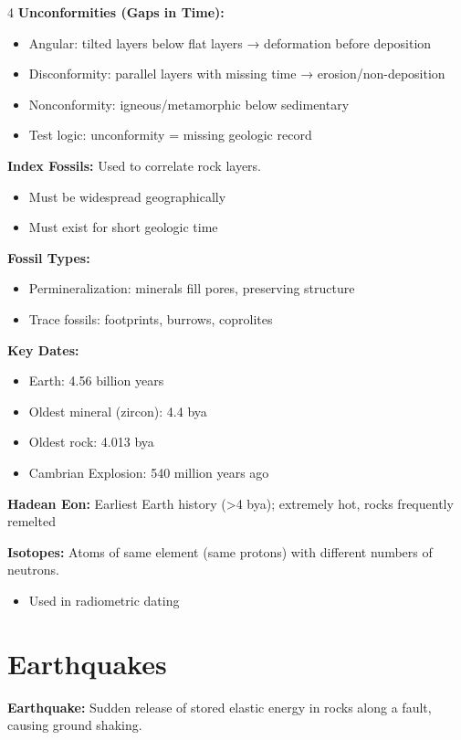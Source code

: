 \documentclass[10pt]{article}
\begin{document}
\begin{multicols}{4}
\textbf{Unconformities (Gaps in Time):}
\begin{itemize}
\item Angular: tilted layers below flat layers → deformation before deposition
\item Disconformity: parallel layers with missing time → erosion/non-deposition
\item Nonconformity: igneous/metamorphic below sedimentary
\item Test logic: unconformity = missing geologic record
\end{itemize}

\textbf{Index Fossils:}
Used to correlate rock layers.
\begin{itemize}
\item Must be widespread geographically
\item Must exist for short geologic time
\end{itemize}

\textbf{Fossil Types:}
\begin{itemize}
\item Permineralization: minerals fill pores, preserving structure
\item Trace fossils: footprints, burrows, coprolites
\end{itemize}

\textbf{Key Dates:}
\begin{itemize}
\item Earth: 4.56 billion years
\item Oldest mineral (zircon): 4.4 bya
\item Oldest rock: 4.013 bya
\item Cambrian Explosion: 540 million years ago
\end{itemize}

\textbf{Hadean Eon:}
Earliest Earth history (>4 bya); extremely hot, rocks frequently remelted

\textbf{Isotopes:}
Atoms of same element (same protons) with different numbers of neutrons.
\begin{itemize}
\item Used in radiometric dating
\end{itemize}

\section*{Earthquakes}

\textbf{Earthquake:}
Sudden release of stored elastic energy in rocks along a fault, causing ground shaking.


\end{multicols}
\end{document}

